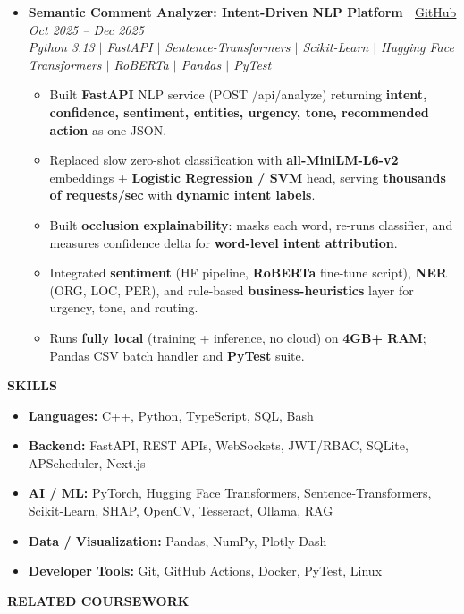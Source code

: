 \documentclass[10pt,article]{article}
\newcommand{\resheading}[1]{{\small \colorbox{mygrey}{\begin{minipage}{\textwidth}\textbf{#1 \vphantom{p\^{E}}}\end{minipage}}}}
\begin{document}
\begin{itemize}[leftmargin=*]
\vspace{2pt}
\item \textbf{Semantic Comment Analyzer: Intent-Driven NLP Platform} | \href{https://github.com/IDKHowToCodeFR/Semantic-Comment-Analyze}{GitHub} \hfill \textit{Oct 2025 -- Dec 2025} \\
\textit{\footnotesize Python 3.13 $|$ FastAPI $|$ Sentence-Transformers $|$ Scikit-Learn $|$ Hugging Face Transformers $|$ RoBERTa $|$ Pandas $|$ PyTest}
\begin{itemize}[noitemsep, leftmargin=*]\footnotesize
\item Built \textbf{FastAPI} NLP service (POST /api/analyze) returning \textbf{intent, confidence, sentiment, entities, urgency, tone, recommended action} as one JSON.
\item Replaced slow zero-shot classification with \textbf{all-MiniLM-L6-v2} embeddings + \textbf{Logistic Regression / SVM} head, serving \textbf{thousands of requests/sec} with \textbf{dynamic intent labels}.
\item Built \textbf{occlusion explainability}: masks each word, re-runs classifier, and measures confidence delta for \textbf{word-level intent attribution}.
\item Integrated \textbf{sentiment} (HF pipeline, \textbf{RoBERTa} fine-tune script), \textbf{NER} (ORG, LOC, PER), and rule-based \textbf{business-heuristics} layer for urgency, tone, and routing.
\item Runs \textbf{fully local} (training + inference, no cloud) on \textbf{4GB+ RAM}; Pandas CSV batch handler and \textbf{PyTest} suite.
\end{itemize}
\end{itemize}

\noindent
\resheading{\textbf{SKILLS}}
\begin{itemize}[noitemsep, leftmargin=*]\small
\item \textbf{Languages:} C++, Python, TypeScript, SQL, Bash
\item \textbf{Backend:} FastAPI, REST APIs, WebSockets, JWT/RBAC, SQLite, APScheduler, Next.js
\item \textbf{AI / ML:} PyTorch, Hugging Face Transformers, Sentence-Transformers, Scikit-Learn, SHAP, OpenCV, Tesseract, Ollama, RAG
\item \textbf{Data / Visualization:} Pandas, NumPy, Plotly Dash
\item \textbf{Developer Tools:} Git, GitHub Actions, Docker, PyTest, Linux
\end{itemize}

\vspace{3pt}
\noindent
\resheading{\textbf{RELATED COURSEWORK}}\par
\vspace{3pt}
\end{document}
